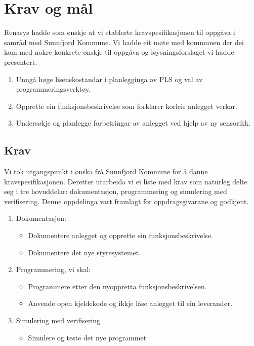 \chapter{Krav og mål}
\thispagestyle{fancy}
\label{sec: 5}

\gls{Renasys} hadde som ønskje at vi etablerte kravspesifikasjonen til oppgåva 
i samråd med \gls{Sunnfjord Kommune}.\newline
Vi hadde eit møte med kommunen der dei kom med nokre konkrete ønskje til oppgåva
og løysningsforslaget vi hadde presentert.

\begin{enumerate}
    \item Unngå høge lisenskostandar i planlegginga av PLS og val av programmeringsverktøy.
    \item Opprette ein funksjonsbeskrivelse som forklarer korleis anlegget verkar.
    \item Undersøkje og planlegge forbetringar av anlegget ved hjelp av ny sensorikk.
\end{enumerate}

\section{Krav}
Vi tok utgangspunkt i ønska frå \gls{Sunnfjord Kommune} for å danne kravspesifikasjonen.
Deretter utarbeida vi ei liste med krav som naturleg delte seg i tre
hovuddelar: dokumentasjon, programmering og simulering med verifisering. 
Denne oppdelinga vart framlagt for oppdragsgivarane og godkjent. 

\begin{enumerate}
    \item Dokumentasjon:
    \begin{itemize}
        \item Dokumentere anlegget og opprette ein funksjonsbeskrivelse.
        \item Dokumentere det nye styresystemet.
    \end{itemize}
    \item Programmering, vi skal:
    \begin{itemize}
        \item Programmere etter den nyoppretta funksjonsbeskrivelsen.
        \item Anvende open kjeldekode og ikkje låse anlegget til ein leverandør.
    \end{itemize}
    \item Simulering med verifisering
    \begin{itemize}
        \item Simulere og teste det nye programmet
    \end{itemize}
\end{enumerate}


